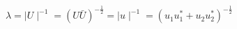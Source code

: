 \begin{equation}
\lambda = \mid U\mid^{-1} = (U \bar{U})^{-\frac{1}{2}}=\mid u\mid^{-1} = (u_{1} u_{1}^{\ast} + u_{2}
u_{2}^{\ast})^{-\frac{1}{2}}
\end{equation}

